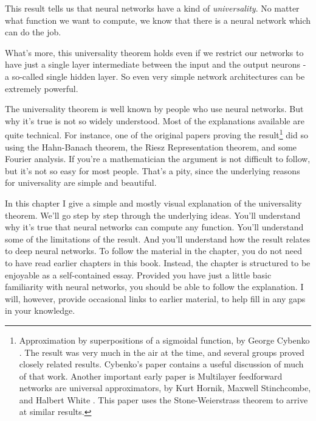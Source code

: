 This result tells us that neural networks have a kind of \textit{universality}. No matter what function we want to compute, we know that there is a neural network which can do the job.

What's more, this universality theorem holds even if we restrict our networks to have just a single layer intermediate between the input and the output neurons - a so-called single hidden layer. So even very simple network architectures can be extremely powerful.

The universality theorem is well known by people who use neural networks. But why it's true is not so widely understood. Most of the explanations available are quite technical. For instance, one of the original papers proving the result\footnote{Approximation by superpositions of a sigmoidal function, by George Cybenko \cite{Cybenko1989}. The result was very much in the air at the time, and several groups proved closely related results. Cybenko's paper contains a useful discussion of much of that work. Another important early paper is Multilayer feedforward networks are universal approximators, by Kurt Hornik, Maxwell Stinchcombe, and Halbert White \cite{Hornik1989}. This paper uses the Stone-Weierstrass theorem to arrive at similar results.} did so using the Hahn-Banach theorem, the Riesz Representation theorem, and some Fourier analysis. If you're a mathematician the argument is not difficult to follow, but it's not so easy for most people. That's a pity, since the underlying reasons for universality are simple and beautiful.

In this chapter I give a simple and mostly visual explanation of the universality theorem. We'll go step by step through the underlying ideas. You'll understand why it's true that neural networks can compute any function. You'll understand some of the limitations of the result. And you'll understand how the result relates to deep neural networks.
To follow the material in the chapter, you do not need to have read earlier chapters in this book. Instead, the chapter is structured to be enjoyable as a self-contained essay. Provided you have just a little basic familiarity with neural networks, you should be able to follow the explanation. I will, however, provide occasional links to earlier material, to help fill in any gaps in your knowledge.

